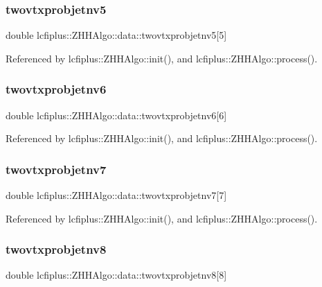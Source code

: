 \subsubsection{twovtxprobjetnv5}
{\footnotesize\ttfamily double lcfiplus\+::\+Z\+H\+H\+Algo\+::data\+::twovtxprobjetnv5[5]}



Referenced by lcfiplus\+::\+Z\+H\+H\+Algo\+::init(), and lcfiplus\+::\+Z\+H\+H\+Algo\+::process().

\mbox{\label{structlcfiplus_1_1ZHHAlgo_1_1data_a18c1871bc6dcf99ea383516a843ad623}} 
\subsubsection{twovtxprobjetnv6}
{\footnotesize\ttfamily double lcfiplus\+::\+Z\+H\+H\+Algo\+::data\+::twovtxprobjetnv6[6]}



Referenced by lcfiplus\+::\+Z\+H\+H\+Algo\+::init(), and lcfiplus\+::\+Z\+H\+H\+Algo\+::process().

\mbox{\label{structlcfiplus_1_1ZHHAlgo_1_1data_a80459284468bb43b0b266cda69cdee5c}} 
\subsubsection{twovtxprobjetnv7}
{\footnotesize\ttfamily double lcfiplus\+::\+Z\+H\+H\+Algo\+::data\+::twovtxprobjetnv7[7]}



Referenced by lcfiplus\+::\+Z\+H\+H\+Algo\+::init(), and lcfiplus\+::\+Z\+H\+H\+Algo\+::process().

\mbox{\label{structlcfiplus_1_1ZHHAlgo_1_1data_af23f0036c4457ae5170c0a8445905851}} 
\subsubsection{twovtxprobjetnv8}
{\footnotesize\ttfamily double lcfiplus\+::\+Z\+H\+H\+Algo\+::data\+::twovtxprobjetnv8[8]}



